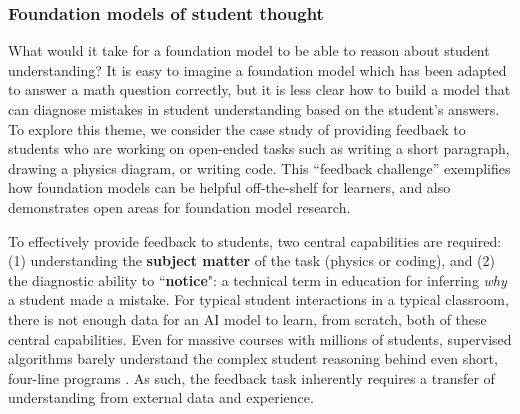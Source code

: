 \subsubsection{Foundation models of student thought}

What would it take for a foundation model to be able to reason about student understanding? It is easy to imagine a foundation model which has been adapted to answer a math question correctly, but it is less clear how to build a model that can diagnose mistakes in student understanding based on the student's answers. To explore this theme, we consider the case study of providing feedback to students who are working on open-ended tasks such as writing a short paragraph, drawing a physics diagram, or writing code. 
This ``feedback challenge'' exemplifies how foundation models can be helpful off-the-shelf for learners, and also demonstrates open areas for foundation model research. 

To effectively provide feedback to students, two central capabilities are required: (1) understanding the \textbf{subject matter} of the task (\eg physics or coding), and (2) the diagnostic ability to ``\textbf{notice}": a technical term in education for inferring \emph{why} a student made a mistake. For typical student interactions in a typical classroom, there is not enough data for an AI model to learn, from scratch, both of these central capabilities. Even for massive courses with millions of students, supervised algorithms barely understand the complex student reasoning behind even short, four-line programs \citep{malik2021generative}. As such, the feedback task inherently requires a transfer of understanding from external data and experience.

